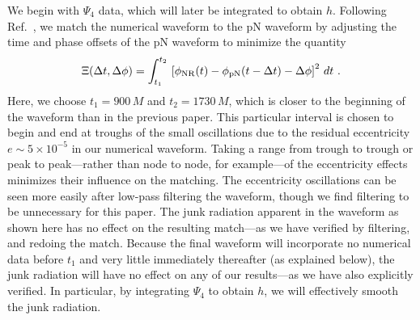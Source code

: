 We begin with $\Psi_4$ data, which will later be integrated to obtain
$h$.  Following Ref.~\cite{Boyle2008a}, we match the numerical
waveform to the pN waveform by adjusting the time and phase offsets of
the pN waveform to minimize the quantity
\begin{equation}
  \label{eq:MatchingChiSquared}
  \Xi(\Delta t, \Delta \phi) = \int_{t_{1}}^{t_{2}}\, \left[
    \phi_{\mathrm{NR}}(t) - \phi_{\mathrm{pN}}(t - \Delta t) - \Delta \phi
  \right]^{2}\, d t \ .
\end{equation}
Here, we choose $t_{1}=900\,M$ and $t_{2}=1730\,M$, which is closer to
the beginning of the waveform than in the previous paper.  This
particular interval is chosen to begin and end at troughs of the small
oscillations due to the residual eccentricity $e\sim 5\times 10^{-5}$
in our numerical waveform.  Taking a range from trough to trough or
peak to peak---rather than node to node, for example---of the
eccentricity effects minimizes their influence on the matching.  The
eccentricity oscillations can be seen more easily after low-pass
filtering the waveform, though we find filtering to be unnecessary for
this paper.  The junk radiation apparent in the waveform as shown here
has no effect on the resulting match---as we have verified by
filtering, and redoing the match.  Because the final waveform will
incorporate no numerical data before $t_{1}$ and very little
immediately thereafter (as explained below), the junk radiation will
have no effect on any of our results---as we have also explicitly
verified.  In particular, by integrating $\Psi_{4}$ to obtain $h$, we
will effectively smooth the junk radiation.

